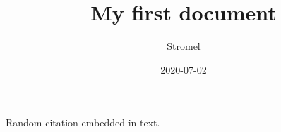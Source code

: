 \documentclass{article}
\title{My first document}
\date{2020-07-02}
\author{Stromel}
\begin{document}
	
	Random citation \cite{DUMMY:1} embedded in text.
	
	\newpage
	
	
	
\end{document}
